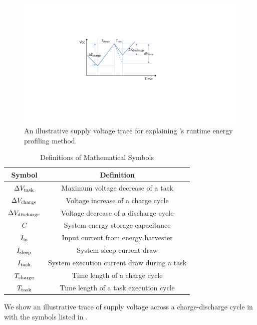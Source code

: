 \begin{figure}
    \centering
    \includegraphics[width=0.9\columnwidth]{ch5_optic/figures/temp.pdf}
    \caption{An illustrative supply voltage trace for explaining \nn{}'s runtime energy profiling method. }
    \label{fig:math}
\end{figure}

\begin{table}[!t]
    \renewcommand{\arraystretch}{1.2}
    \centering
    \caption{Definitions of Mathematical Symbols}
    \label{tab:symbols}
    \begin{tabular}{|c|c|}
    \hline
    \textbf{Symbol} & \textbf{Definition} \\
    \hline
    $\Delta V_{\text{task}}$ & Maximum voltage decrease of a task \\
    $\Delta V_{\text{charge}}$ & Voltage increase of a charge cycle \\
    $\Delta V_{\text{discharge}}$ & Voltage decrease of a discharge cycle \\
    $C$ & System energy storage capacitance \\
    $I_{\text{in}}$ & Input current from energy harvester \\
    $I_{\text{sleep}}$ & System sleep current draw \\
    $I_{\text{task}}$ & System execution current draw during a task \\
    $T_{\text{charge}}$ & Time length of a charge cycle  \\
    $T_{\text{task}}$ & Time length of a task execution cycle  \\
    \hline
    \end{tabular}
\end{table}

We show an illustrative trace of supply voltage across a charge-discharge cycle in  with the symbols listed in . 

